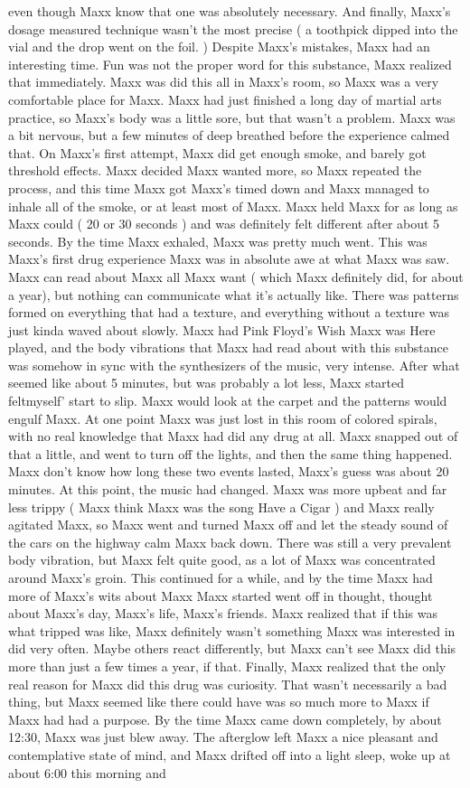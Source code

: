 \documentclass[12pt]{book}
\begin{document}
even though Maxx know that one was absolutely necessary. And finally, Maxx's dosage measured technique wasn't the most precise ( a toothpick dipped into the vial and the drop went on the foil. ) Despite Maxx's mistakes, Maxx had an interesting time. Fun was not the proper word for this substance, Maxx realized that immediately. Maxx was did this all in Maxx's room, so Maxx was a very comfortable place for Maxx. Maxx had just finished a long day of martial arts practice, so Maxx's body was a little sore, but that wasn't a problem. Maxx was a bit nervous, but a few minutes of deep breathed before the experience calmed that. On Maxx's first attempt, Maxx did get enough smoke, and barely got threshold effects. Maxx decided Maxx wanted more, so Maxx repeated the process, and this time Maxx got Maxx's timed down and Maxx managed to inhale all of the smoke, or at least most of Maxx. Maxx held Maxx for as long as Maxx could ( 20 or 30 seconds ) and was definitely felt different after about 5 seconds. By the time Maxx exhaled, Maxx was pretty much went. This was Maxx's first drug experience Maxx was in absolute awe at what Maxx was saw. Maxx can read about Maxx all Maxx want ( which Maxx definitely did, for about a year), but nothing can communicate what it's actually like. There was patterns formed on everything that had a texture, and everything without a texture was just kinda waved about slowly. Maxx had Pink Floyd's Wish Maxx was Here played, and the body vibrations that Maxx had read about with this substance was somehow in sync with the synthesizers of the music, very intense. After what seemed like about 5 minutes, but was probably a lot less, Maxx started feltmyself' start to slip. Maxx would look at the carpet and the patterns would engulf Maxx. At one point Maxx was just lost in this room of colored spirals, with no real knowledge that Maxx had did any drug at all. Maxx snapped out of that a little, and went to turn off the lights, and then the same thing happened. Maxx don't know how long these two events lasted, Maxx's guess was about 20 minutes. At this point, the music had changed. Maxx was more upbeat and far less trippy ( Maxx think Maxx was the song Have a Cigar ) and Maxx really agitated Maxx, so Maxx went and turned Maxx off and let the steady sound of the cars on the highway calm Maxx back down. There was still a very prevalent body vibration, but Maxx felt quite good, as a lot of Maxx was concentrated around Maxx's groin. This continued for a while, and by the time Maxx had more of Maxx's wits about Maxx Maxx started went off in thought, thought about Maxx's day, Maxx's life, Maxx's friends. Maxx realized that if this was what tripped was like, Maxx definitely wasn't something Maxx was interested in did very often. Maybe others react differently, but Maxx can't see Maxx did this more than just a few times a year, if that. Finally, Maxx realized that the only real reason for Maxx did this drug was curiosity. That wasn't necessarily a bad thing, but Maxx seemed like there could have was so much more to Maxx if Maxx had had a purpose. By the time Maxx came down completely, by about 12:30, Maxx was just blew away. The afterglow left Maxx a nice pleasant and contemplative state of mind, and Maxx drifted off into a light sleep, woke up at about 6:00 this morning and 
\end{document}
